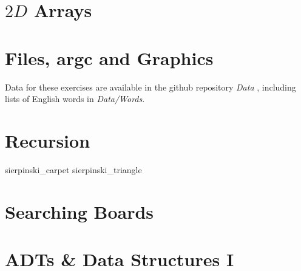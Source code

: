 \chapter{$2D$ Arrays}









%

\chapter{Files, argc and Graphics}

Data for these exercises
are available in the github repository {\em Data}
, including lists of English words in {\em Data/Words}.







\setcounter{chapter}{6}
\chapter{Recursion}






 {sierpinski_carpet}
 {sierpinski_triangle}

%

\chapter{Searching Boards}








\chapter{ADTs \& Data Structures I}

